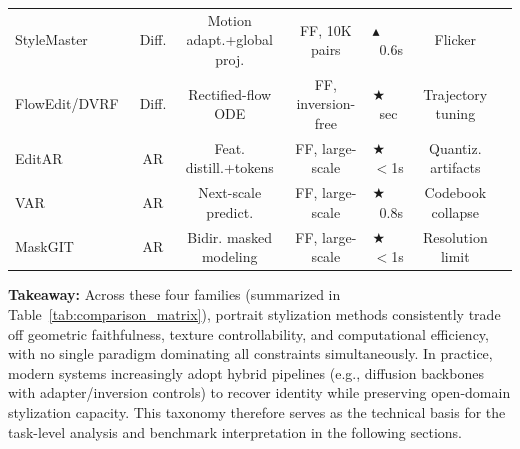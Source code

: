 \documentclass[journal]{IEEEtran}
\begin{document}
\begin{table}[t]
\begin{tabular}{lcccp{1.8cm}cl}
StyleMaster~\cite{ye2024stylemastersy} & Diff. & Motion adapt.+global proj. & FF, 10K pairs & $\blacktriangle$~0.6s & Flicker \\
FlowEdit/DVRF~\cite{flowedit2025,dvrf2025} & Diff. & Rectified-flow ODE & FF, inversion-free & $\bigstar$~sec & Trajectory tuning \\
\midrule
EditAR~\cite{mu2025editar} & AR & Feat. distill.+tokens & FF, large-scale & $\bigstar$~$<$1s & Quantiz. artifacts \\
VAR~\cite{tian2024var} & AR & Next-scale predict. & FF, large-scale & $\bigstar$~0.8s & Codebook collapse \\
MaskGIT~\cite{chang2022maskgit} & AR & Bidir. masked modeling & FF, large-scale & $\bigstar$~$<$1s & Resolution limit \\
\bottomrule
\end{tabular}
\setlength{\tabcolsep}{6pt}
\end{table}

\textbf{Takeaway:} Across these four families (summarized in Table~\ref{tab:comparison_matrix}), portrait stylization methods consistently trade off geometric faithfulness, texture controllability, and computational efficiency, with no single paradigm dominating all constraints simultaneously. In practice, modern systems increasingly adopt hybrid pipelines (e.g., diffusion backbones with adapter/inversion controls) to recover identity while preserving open-domain stylization capacity. This taxonomy therefore serves as the technical basis for the task-level analysis and benchmark interpretation in the following sections.
\end{document}
